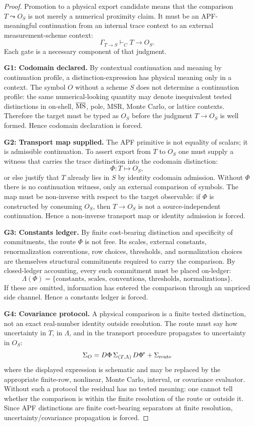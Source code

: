 \begin{proof}
Promotion to a physical export candidate means that the comparison $T\leadsto O_S$ is not merely a numerical proximity claim.  It must be an APF-meaningful continuation from an internal trace context to an external measurement-scheme context:
\[
        \Gamma_{T\to S}\vdash_C T\to O_S.
\]
Each gate is a necessary component of that judgment.

\smallskip
\noindent\textbf{G1: Codomain declared.}
By contextual continuation and meaning by continuation profile, a distinction-expression has physical meaning only in a context.  The symbol $O$ without a scheme $S$ does not determine a continuation profile: the same numerical-looking quantity may denote inequivalent tested distinctions in on-shell, $\overline{\rm MS}$, pole, MSR, Monte Carlo, or lattice contexts.  Therefore the target must be typed as $O_S$ before the judgment $T\to O_S$ is well formed.  Hence codomain declaration is forced.

\smallskip
\noindent\textbf{G2: Transport map supplied.}
The APF primitive is not equality of scalars; it is admissible continuation.  To assert export from $T$ to $O_S$ one must supply a witness that carries the trace distinction into the codomain distinction:
\[
        \Phi:T\mapsto O_S,
\]
or else justify that $T$ already lies in $S$ by identity codomain admission.  Without $\Phi$ there is no continuation witness, only an external comparison of symbols.  The map must be non-inverse with respect to the target observable: if $\Phi$ is constructed by consuming $O_S$, then $T\to O_S$ is not a source-independent continuation.  Hence a non-inverse transport map or identity admission is forced.

\smallskip
\noindent\textbf{G3: Constants ledger.}
By finite cost-bearing distinction and specificity of commitments, the route $\Phi$ is not free.  Its scales, external constants, renormalization conventions, row choices, thresholds, and normalization choices are themselves structural commitments required to carry the comparison.  By closed-ledger accounting, every such commitment must be placed on-ledger:
\[
        \Lambda(\Phi)=\{\text{constants, scales, conventions, thresholds, normalizations}\}.
\]
If these are omitted, information has entered the comparison through an unpriced side channel.  Hence a constants ledger is forced.

\smallskip
\noindent\textbf{G4: Covariance protocol.}
A physical comparison is a finite tested distinction, not an exact real-number identity outside resolution.  The route must say how uncertainty in $T$, in $\Lambda$, and in the transport procedure propagates to uncertainty in $O_S$:
\[
        \Sigma_{O}=D\Phi\,\Sigma_{(T,\Lambda)}\,D\Phi^{\!*}+\Sigma_{\rm route}
\]
where the displayed expression is schematic and may be replaced by the appropriate finite-row, nonlinear, Monte Carlo, interval, or covariance evaluator.  Without such a protocol the residual has no tested meaning: one cannot tell whether the comparison is within the finite resolution of the route or outside it.  Since APF distinctions are finite cost-bearing separators at finite resolution, uncertainty/covariance propagation is forced.


\end{proof}
